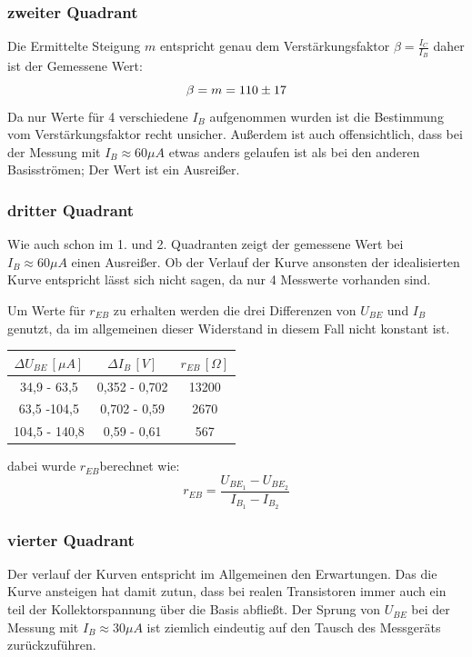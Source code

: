 \subsubsection{zweiter Quadrant}
Die Ermittelte Steigung \(m\) entspricht genau dem Verstärkungsfaktor \(\beta = \frac{I_C}{I_B}\) daher ist der Gemessene Wert:
\begin{equation}
\beta = m = 110 \pm 17 \notag
\end{equation}
Da nur Werte für 4 verschiedene \(I_{B}\) aufgenommen wurden ist die Bestimmung vom Verstärkungsfaktor recht unsicher. Außerdem ist auch offensichtlich, dass bei der Messung mit \(I_B \approx 60 \mu A\) etwas anders gelaufen ist als bei den anderen Basisströmen; Der Wert ist ein Ausreißer.
\subsubsection{dritter Quadrant}
Wie auch schon im 1. und 2. Quadranten zeigt der gemessene Wert bei \(I_B \approx 60 \mu A\) einen Ausreißer. Ob der Verlauf der Kurve ansonsten der idealisierten Kurve entspricht lässt sich nicht sagen, da nur 4 Messwerte vorhanden sind.  

Um Werte für \(r_{EB}\) zu erhalten werden die drei Differenzen von \(U_{BE}\) und \(I_{B}\) genutzt, da im allgemeinen dieser Widerstand in diesem Fall nicht konstant ist.
\begin{center}
\begin{tabular}{c|c|c}
\(\Delta U_{BE}\, [\mu A]\) & \(\Delta I_B\, [V]\) &  \(r_{EB}\, [\Omega]\) \\\hline
34,9 - 63,5 & 0,352 - 0,702 & 13200\\
63,5 -104,5 & 0,702 - 0,59 & 2670\\
104,5 - 140,8 & 0,59 - 0,61 & 567
\end{tabular}
\end{center}
dabei wurde \(r_{EB}\)berechnet wie:
\begin{equation}
r_{EB} = \frac{U_{BE_1}-U_{BE_2}}{I_{B_1}-I_{B_2}}
\end{equation}
\subsubsection{vierter Quadrant}
Der verlauf der Kurven entspricht im Allgemeinen den Erwartungen. Das die Kurve ansteigen hat damit zutun, dass bei realen Transistoren immer auch ein teil der Kollektorspannung über die Basis abfließt. Der Sprung von \(U_{BE}\) bei der Messung mit \(I_B \approx 30 \mu A\) ist ziemlich eindeutig auf den Tausch des Messgeräts zurückzuführen.
